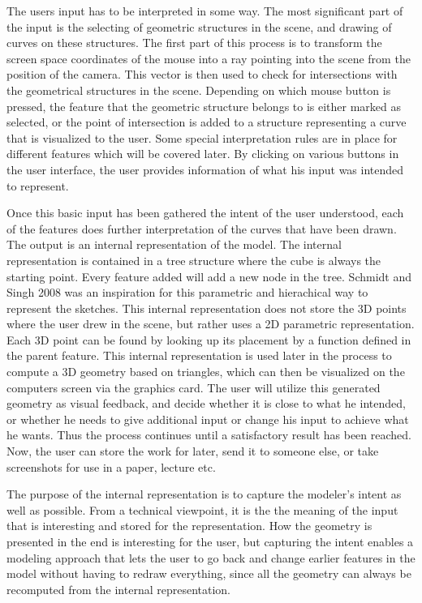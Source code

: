 \documentclass[a4paper,12pt]{report}
\begin{document}
The users input has to be interpreted in some way. The most significant part of the input is the selecting of geometric structures in the scene, and drawing of curves on these structures. The first part of this process is to transform the screen space coordinates of the mouse into a ray pointing into the scene from the position of the camera. This vector is then used to check for intersections with the geometrical structures in the scene. Depending on which mouse button is pressed, the feature that the geometric structure belongs to is either marked as selected, or the point of intersection is added to a structure representing a curve that is visualized to the user. Some special interpretation rules are in place for different features which will be covered later. By clicking on various buttons in the user interface, the user provides information of what his input was intended to represent.

Once this basic input has been gathered the intent of the user understood, each of the features does further interpretation of the curves that have been drawn. The output is an internal representation of the model. The internal representation is contained in a tree structure where the cube is always the starting point.  Every feature added will add a new node in the tree. Schmidt and Singh 2008 \cite{CGF:CGF1129} was an inspiration for this parametric and hierachical way to represent the sketches. This internal representation does not store the 3D points where the user drew in the scene, but rather uses a 2D parametric representation. Each 3D point can be found by looking up its placement by a function defined in the parent feature. This internal representation is used later in the process to compute a 3D geometry based on triangles, which can then be visualized on the computers screen via the graphics card. The user will utilize this generated geometry as visual feedback, and decide whether it is close to 
what he intended, or whether he needs to give additional input or change his input to achieve what he wants. Thus the process continues until a satisfactory result has been reached. Now, the user can store the work for later, send it to someone else, or take screenshots for use in a paper, lecture etc.




The purpose of the internal representation is to capture the modeler's intent as well as possible. From a technical viewpoint, it is the the meaning of the input that is interesting and stored for the representation. How the geometry is presented in the end is interesting for the user, but capturing the intent enables a modeling approach that lets the user to go back and change earlier features in the model without having to redraw everything, since all the geometry can always be recomputed from the internal representation.
\end{document}
